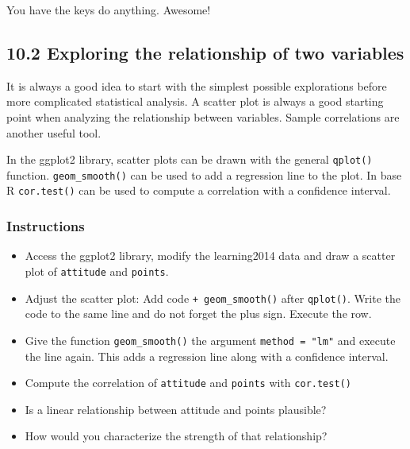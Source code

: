 \documentclass[]{article}
\newenvironment{Shaded}{\begin{snugshade}}{\end{snugshade}}
\newcommand{\CommentTok}[1]{\textcolor[rgb]{0.56,0.35,0.01}{\textit{#1}}}
\newcommand{\DataTypeTok}[1]{\textcolor[rgb]{0.13,0.29,0.53}{#1}}
\newcommand{\DecValTok}[1]{\textcolor[rgb]{0.00,0.00,0.81}{#1}}
\newcommand{\KeywordTok}[1]{\textcolor[rgb]{0.13,0.29,0.53}{\textbf{#1}}}
\newcommand{\NormalTok}[1]{#1}
\newcommand{\OperatorTok}[1]{\textcolor[rgb]{0.81,0.36,0.00}{\textbf{#1}}}
\newcommand{\OtherTok}[1]{\textcolor[rgb]{0.56,0.35,0.01}{#1}}
\newcommand{\StringTok}[1]{\textcolor[rgb]{0.31,0.60,0.02}{#1}}
\providecommand{\tightlist}{%
  \setlength{\itemsep}{0pt}\setlength{\parskip}{0pt}}
\begin{document}
\begin{Shaded}
\end{Shaded}

You have the keys do anything. Awesome!

\hypertarget{exploring-the-relationship-of-two-variables}{%
\subsection{10.2 Exploring the relationship of two
variables}\label{exploring-the-relationship-of-two-variables}}

It is always a good idea to start with the simplest possible
explorations before more complicated statistical analysis. A scatter
plot is always a good starting point when analyzing the relationship
between variables. Sample correlations are another useful tool.

In the ggplot2 library, scatter plots can be drawn with the general
\texttt{qplot()} function. \texttt{geom\_smooth()} can be used to add a
regression line to the plot. In base R \texttt{cor.test()} can be used
to compute a correlation with a confidence interval.

\hypertarget{instructions-1}{%
\subsubsection{Instructions}\label{instructions-1}}

\begin{itemize}
\tightlist
\item
  Access the ggplot2 library, modify the learning2014 data and draw a
  scatter plot of \texttt{attitude} and \texttt{points}.
\item
  Adjust the scatter plot: Add code \texttt{+\ geom\_smooth()} after
  \texttt{qplot()}. Write the code to the same line and do not forget
  the plus sign. Execute the row.
\item
  Give the function \texttt{geom\_smooth()} the argument
  \texttt{method\ =\ "lm"} and execute the line again. This adds a
  regression line along with a confidence interval.
\item
  Compute the correlation of \texttt{attitude} and \texttt{points} with
  \texttt{cor.test()}
\item
  Is a linear relationship between attitude and points plausible?
\item
  How would you characterize the strength of that relationship?
\end{itemize}
\end{document}
